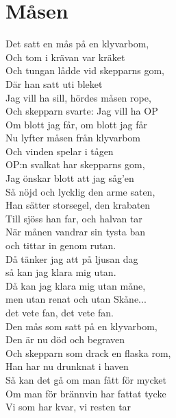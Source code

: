 \section{Måsen}
Det satt en mås på en klyvarbom,\\
Och tom i krävan var kräket\\
Och tungan lådde vid skepparns gom,\\
Där han satt uti bleket\\
Jag vill ha sill, hördes måsen rope,\\
Och skepparn svarte: Jag vill ha OP\\
Om blott jag får, om blott jag får\\

Nu lyfter måsen från klyvarbom\\
Och vinden spelar i tågen\\
OP:n svalkat har skepparns gom,\\
Jag önskar blott att jag såg’en\\
Så nöjd och lycklig den arme saten,\\
Han sätter storsegel, den krabaten\\
Till sjöss han far, och halvan tar\\

När månen vandrar sin tysta ban\\
och tittar in genom rutan.\\
Då tänker jag att på ljusan dag\\
så kan jag klara mig utan.\\
Då kan jag klara mig utan måne,\\
men utan renat och utan Skåne...\\
det vete fan, det vete fan.\\

Den mås som satt på en klyvarbom,\\
Den är nu död och begraven\\
Och skepparn som drack en flaska rom,\\
Han har nu drunknat i haven\\
Så kan det gå om man fått för mycket\\
Om man för brännvin har fattat tycke\\
Vi som har kvar, vi resten tar\\
